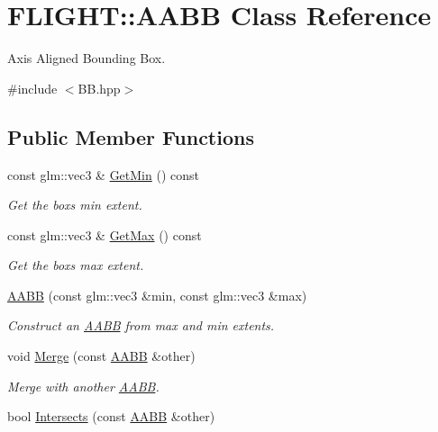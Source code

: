 \hypertarget{class_f_l_i_g_h_t_1_1_a_a_b_b}{}\section{F\+L\+I\+G\+HT\+:\+:A\+A\+BB Class Reference}
\label{class_f_l_i_g_h_t_1_1_a_a_b_b}


Axis Aligned Bounding Box.  




{\ttfamily \#include $<$B\+B.\+hpp$>$}

\subsection*{Public Member Functions}
\begin{DoxyCompactItemize}
\item 
const glm\+::vec3 \& \hyperlink{class_f_l_i_g_h_t_1_1_a_a_b_b_ae0313494cc7b8cff65782b5ba9499c00}{Get\+Min} () const
\begin{DoxyCompactList}\small\item\em Get the box\textquotesingle{}s min extent. \end{DoxyCompactList}\item 
const glm\+::vec3 \& \hyperlink{class_f_l_i_g_h_t_1_1_a_a_b_b_aa479f15e7e2edd4a32270c6ad2dbed0b}{Get\+Max} () const
\begin{DoxyCompactList}\small\item\em Get the box\textquotesingle{}s max extent. \end{DoxyCompactList}\item 
\hyperlink{class_f_l_i_g_h_t_1_1_a_a_b_b_ad34475c7ab115bfafa467358e1e377b6}{A\+A\+BB} (const glm\+::vec3 \&min, const glm\+::vec3 \&max)
\begin{DoxyCompactList}\small\item\em Construct an \hyperlink{class_f_l_i_g_h_t_1_1_a_a_b_b}{A\+A\+BB} from max and min extents. \end{DoxyCompactList}\item 
void \hyperlink{class_f_l_i_g_h_t_1_1_a_a_b_b_abd48eeb4249c76e3e2f14ed89e619031}{Merge} (const \hyperlink{class_f_l_i_g_h_t_1_1_a_a_b_b}{A\+A\+BB} \&other)
\begin{DoxyCompactList}\small\item\em Merge with another \hyperlink{class_f_l_i_g_h_t_1_1_a_a_b_b}{A\+A\+BB}. \end{DoxyCompactList}\item 
bool \hyperlink{class_f_l_i_g_h_t_1_1_a_a_b_b_ac9fdbd999e7cfd1623cfb95138efc2c2}{Intersects} (const \hyperlink{class_f_l_i_g_h_t_1_1_a_a_b_b}{A\+A\+BB} \&other)

\end{DoxyCompactItemize}

